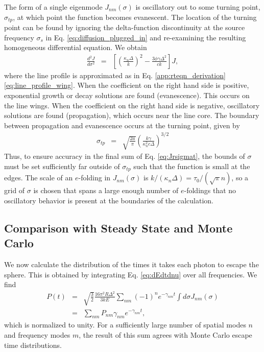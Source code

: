 \documentclass{aastex63}
\newcommand{\be}{\begin{eqnarray}}
\newcommand{\ee}{\end{eqnarray}}
\begin{document}
The form of a single eigenmode $J_{nm}(\sigma)$ is oscillatory out to some turning point, $\sigma_{tp}$, at which point the function becomes evanescent. The location of the turning point can be found by ignoring the delta-function discontinuity at the source frequency $\sigma_s$ in Eq. \ref{eq:diffusion_plugged_in} and re-examining the resulting homogeneous differential equation. We obtain
\be
\frac{d^2J}{d\sigma^2} & = & \left[ \left( \frac{\kappa_n \Delta }{k} \right)^2 - \frac{3\phi \gamma\Delta^2}{ck}\right] J,
\ee
where the line profile is approximated as in Eq. \ref{app:rteqn_derivation}\ref{eq:line_profile_wing}. When the coefficient on the right hand side is positive, exponential growth or decay solutions are found (evanescence). This occurs on the line wings. When the coefficient on the right hand side is negative, oscillatory solutions are found (propagation), which occurs near the line core. The boundary between propagation and evanescence occurs at the turning point, given by
\be
\sigma_{tp} & = & \sqrt{\frac{2a}{\pi}}\left( \frac{k \gamma}{ \kappa_n^2 c \Delta} \right)^{3/2}
\ee
Thus, to ensure accuracy in the final sum of Eq. \ref{eq:Jrsigmat}, the bounds of $\sigma$ must be set sufficiently far outside of $\sigma_{tp}$ such that the function is small at the edges. The scale of an $e$-folding in $J_{nm}(\sigma)$ is $k/(\kappa_n \Delta) = \tau_0 / (\sqrt{\pi} n)$, so a grid of $\sigma$ is chosen that spans a large enough number of $e$-foldings that no oscillatory behavior is present at the boundaries of the calculation.

\subsection{Comparison with Steady State and Monte Carlo}

We now calculate the distribution of the times it takes each photon to escape the sphere. This is obtained by integrating Eq. \ref{eq:dEdtdnu} over all frequencies. We find
\be
P(t)  & = & \sqrt{\frac{3}{2}} \frac{16\pi^2 R \Delta^2 }{3kE}     \sum_{nm} (-1)^n  e^{-\gamma_{nm}t} \int d\sigma J_{nm}(\sigma) 
\nonumber \\ & = &  \sum_{nm} P_{nm} \gamma_{nm} e^{-\gamma_{nm}t},
\label{eq:waittime}
\ee
which is normalized to unity. For a sufficiently large number of spatial modes $n$ and frequency modes $m$, the result of this sum agrees with Monte Carlo escape time distributions. %
\end{document}
